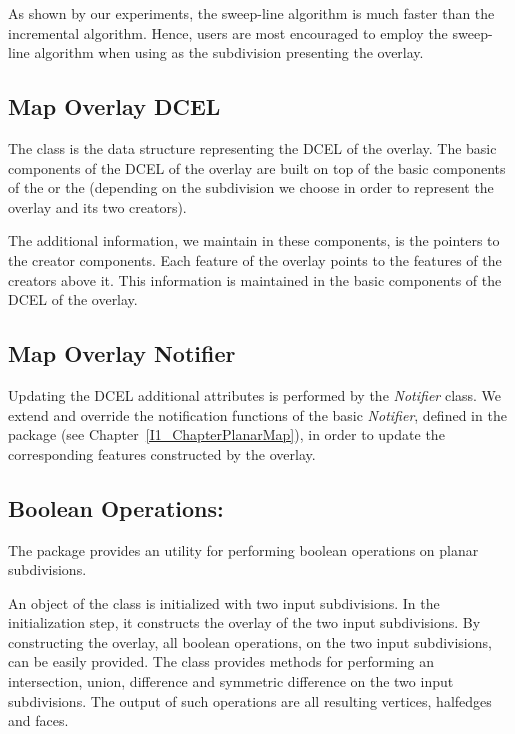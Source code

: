 \begin{ccTexOnly}
As shown by our experiments, the sweep-line algorithm is much faster than the incremental 
algorithm. Hence, users are most encouraged to employ the sweep-line algorithm 
when using  as the subdivision presenting the overlay. 

\subsection*{Map Overlay DCEL}
The 
class is the data structure representing the DCEL of the overlay. 
The basic components of the DCEL of the overlay are built 
on top of the basic components of the  or 
the  
(depending on the subdivision we choose in order to represent the overlay and its 
two creators).

The additional information, we maintain in these components, is the pointers 
to the creator components.
Each feature of the overlay points to the features of the creators above it.
This information is maintained in the basic components of the DCEL of the overlay.

\subsection*{Map Overlay Notifier}
Updating the DCEL additional attributes is performed by the {\em Notifier} class.
We extend and override the notification functions of the basic {\em Notifier}, defined 
in the  package (see Chapter~\ref{I1_ChapterPlanarMap}), 
in order to update the corresponding features constructed by the overlay.  

\subsection*{Boolean Operations:}
The  package
provides an utility for performing boolean operations on planar 
subdivisions.

An object of the  
class is initialized with 
two input subdivisions. 
In the initialization step, it constructs the overlay 
of the two input subdivisions. 
By constructing the overlay, all boolean operations, 
on the two input subdivisions, can be easily provided.
The   
class provides methods for 
performing an intersection, union, 
difference and symmetric difference on the two 
input subdivisions. 
The output of such operations are all resulting vertices, 
halfedges and faces.


\end{ccTexOnly}

